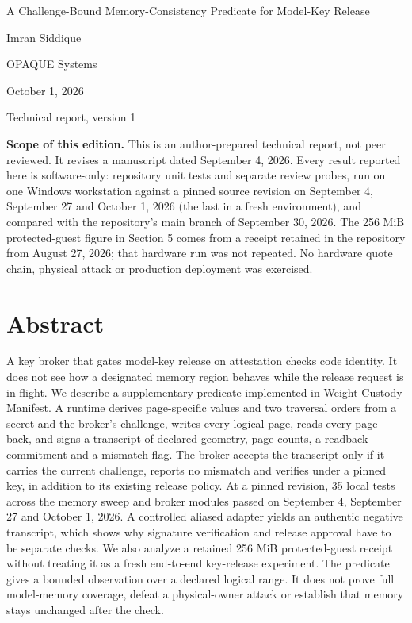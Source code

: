 \documentclass[10pt,letterpaper]{article}
\let\plainsection\section
\renewcommand{\section}{\Needspace{6\baselineskip}\plainsection}
\begin{document}
{\raggedright\headingfont\fontsize{21}{26}\selectfont\color{OceanBlue} A Challenge-Bound Memory-Consistency Predicate for Model-Key Release\par}

\vspace{8pt}Imran Siddique\par OPAQUE Systems\par\vspace{4pt}October 1, 2026\par Technical report, version 1\par

\vspace{5pt}{\color{CoralGreen}\hrule}\vspace{8pt}

\textbf{Scope of this edition.} This is an author-prepared technical report, not peer reviewed. It revises a manuscript dated September 4, 2026. Every result reported here is software-only: repository unit tests and separate review probes, run on one Windows workstation against a pinned source revision on September 4, September 27 and October 1, 2026 (the last in a fresh environment), and compared with the repository's main branch of September 30, 2026. The 256 MiB protected-guest figure in Section 5 comes from a receipt retained in the repository from August 27, 2026; that hardware run was not repeated. No hardware quote chain, physical attack or production deployment was exercised.\par

\section*{Abstract}

A key broker that gates model-key release on attestation checks code identity. It does not see how a designated memory region behaves while the release request is in flight. We describe a supplementary predicate implemented in Weight Custody Manifest. A runtime derives page-specific values and two traversal orders from a secret and the broker's challenge, writes every logical page, reads every page back, and signs a transcript of declared geometry, page counts, a readback commitment and a mismatch flag. The broker accepts the transcript only if it carries the current challenge, reports no mismatch and verifies under a pinned key, in addition to its existing release policy. At a pinned revision, 35 local tests across the memory sweep and broker modules passed on September 4, September 27 and October 1, 2026. A controlled aliased adapter yields an authentic negative transcript, which shows why signature verification and release approval have to be separate checks. We also analyze a retained 256 MiB protected-guest receipt without treating it as a fresh end-to-end key-release experiment. The predicate gives a bounded observation over a declared logical range. It does not prove full model-memory coverage, defeat a physical-owner attack or establish that memory stays unchanged after the check.
\end{document}
